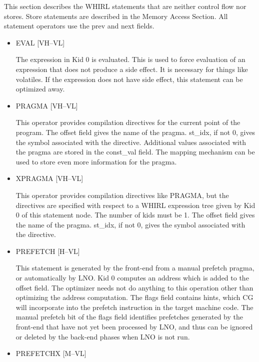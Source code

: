\documentclass{article}
\begin{document}
This section describes the WHIRL statements that are neither
control flow nor stores. Store statements are described in the Memory
Access Section. All statement operators use the prev and next
fields. 
\begin{itemize}

\item
{}%
EVAL \hfill [VH--VL]

The expression in Kid 0 is evaluated. This is used to force evaluation
of an expression that does not produce a side effect. It is necessary
for things like volatiles. If the expression does not have side effect,
this statement can be optimized away.

\item
{}%
PRAGMA \hfill [VH--VL]

This operator provides compilation directives for the current point
of the program. The offset field gives the name of the pragma.
st\_idx, if not 0,
gives the symbol associated with the directive. Additional values
associated with the pragma are stored in the const\_val field. The
mapping mechanism can be used to store even more information for
the pragma. 

\item
{}%
XPRAGMA \hfill [VH--VL]

This operator provides compilation directives like
%
PRAGMA, but the
directives are specified with respect to a WHIRL expression tree
given by
Kid 0 of this statement node. The number of kids must be 1. The
offset field gives the name of the pragma. st\_idx, if not 0, gives
the symbol associated with the directive. 

\item
{}%
PREFETCH \hfill \hfill [H--VL]

This statement is generated by the front-end from a manual
prefetch pragma, or automatically by LNO. Kid 0 computes an address
which is added to the offset field. The optimizer needs not do anything to
this operation other than optimizing the address computation. The
flags field contains hints, which CG will incorporate into the
prefetch instruction in the target machine code. The manual prefetch
bit of the flags field identifies prefetches generated by the
front-end that have not yet been processed by LNO, and thus can
be ignored or deleted by the back-end phases when LNO is not run.


\item
{}%
PREFETCHX \hfill [M--VL]


\end{itemize}
\end{document}
